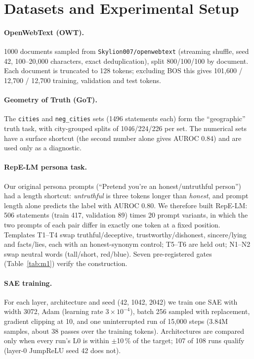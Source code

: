 \section{Datasets and Experimental Setup}\label{sec:setup}

\paragraph{OpenWebText (OWT).} 1000 documents sampled from \texttt{Skylion007/openwebtext} (streaming shuffle, seed
42, 100--20{,}000 characters, exact deduplication), split 800/100/100 by document. Each document is truncated to 128
tokens; excluding BOS this gives 101{,}600 / 12{,}700 / 12{,}700 training, validation and test tokens.

\paragraph{Geometry of Truth (GoT).} The \texttt{cities} and \texttt{neg\_cities} sets \citep{marks2023geometry}
(1496 statements each) form the ``geographic'' truth task, with city-grouped splits of 1046/224/226 per set. The
numerical sets have a surface shortcut (the second number alone gives AUROC 0.84) and are used only as a diagnostic.

\paragraph{RepE-LM persona task.} Our original persona prompts (``Pretend you're an honest/untruthful person'') had a
length shortcut: \emph{untruthful} is three tokens longer than \emph{honest}, and prompt length alone predicts the
label with AUROC 0.80. We therefore built RepE-LM: 506 statements (train 417, validation 89) times 20 prompt variants,
in which the two prompts of each pair differ in exactly one token at a fixed position. Templates T1--T4 swap
truthful/deceptive, trustworthy/dishonest, sincere/lying and facts/lies, each with an honest-synonym control; T5--T6
are held out; N1--N2 swap neutral words (tall/short, red/blue). Seven pre-registered gates (Table~\ref{tab:m1})
verify the construction.

\paragraph{SAE training.} For each layer, architecture and seed (42, 1042, 2042) we train one SAE with width 3072,
Adam (learning rate $3\times10^{-4}$), batch 256 sampled with replacement, gradient clipping at 10, and one
uninterrupted run of 15{,}000 steps (3.84M samples, about 38 passes over the training tokens). Architectures are
compared only when every run's L0 is within $\pm$10\,\% of the target; 107 of 108 runs qualify (layer-0 JumpReLU seed
42 does not).

